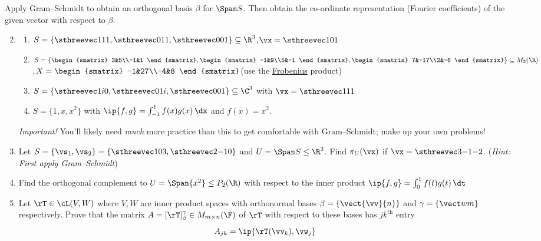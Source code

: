 \bigskip

\begin{exercises}{}{}
\exstart Apply Gram--Schmidt to obtain an orthogonal basis $\beta$ for $\Span S$. Then obtain the co-ordinate representation (Fourier coefficients) of the given vector with respect to $\beta$.
\begin{enumerate}\setcounter{enumi}{1}
  \item[]\begin{enumerate}
    \item $S=\left\{\sthreevec 111,\sthreevec 011,\sthreevec 001\right\}\subseteq\R^3$,\quad $\vx=\sthreevec 101$
    \item $S=\left\{
    \begin{smatrix}
    3&5\\-1&1
    \end{smatrix},
    \begin{smatrix}
    -1&9\\5&-1
    \end{smatrix},
    \begin{smatrix}
    7&-17\\2&-6
    \end{smatrix}
    \right\}\subseteq M_2(\R)$,\quad $X=\begin{smatrix}
    -1&27\\-4&8
    \end{smatrix}$\quad  (use the \hyperref[ex:frobenius]{Frobenius} product)
    \item $S=\left\{\sthreevec 1i0,\sthreevec 01i,\sthreevec 001\right\}\subseteq\C^3$ with $\vx=\sthreevec 111$
    \item $S=\{1,x,x^2\}$ with $\ip{f,g}=\int_{-1}^1f(x)g(x)\,\dx$ and $f(x)=x^2$.
  \end{enumerate}
  \emph{Important!} You'll likely need \emph{much} more practice than this to get comfortable with Gram--Schmidt; make up your own problems!
  \goodbreak
  
  \item Let $S=\{\vs_1,\vs_2\}=\left\{\sthreevec 103,\sthreevec 2{-1}0\right\}$ and $U=\Span S\le\R^3$. Find $\pi_U(\vx)$ if $\vx=\sthreevec 3{-1}{-2}$.\smallbreak
  (\emph{Hint: First apply Gram--Schmidt})
 	
 	\item Find the orthogonal complement to $U=\Span\{x^2\}\le P_2(\R)$ with respect to the inner product $\ip{f,g}=\int_0^1 f(t)g(t)\,\dt$
    
  \item\label{ex:fdipsmatrix} Let $\rT\in\cL(V,W)$ where $V,W$ are inner product spaces with orthonormal bases $\beta=\{\vect{\vv}{n}\}$ and $\gamma=\{\vect wm\}$ respectively. Prove that the matrix $A=[\rT]_\beta^\gamma \in M_{m\times n}(\F)$ of $\rT$ with respect to these bases has $jk^\text{th}$ entry
  \[A_{jk}=\ip{\rT(\vv_k),\vw_j}\]
  

\end{enumerate}
\end{exercises}
